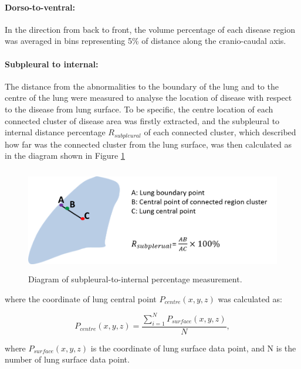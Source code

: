 \paragraph{Dorso-to-ventral:} In the direction from back to front, the volume percentage of each disease region was averaged in bins representing 5\% of distance along the cranio-caudal axis. 

\paragraph{Subpleural to internal:} The distance from the abnormalities to the boundary of the lung and to the centre of the lung were measured to analyse the location of disease with respect to the disease from lung surface. To be specific, the centre location of each connected cluster of disease area was firstly extracted, and the subpleural to internal distance percentage $R_{subpleural}$ of each connected cluster, which described how far was the connected cluster from the lung surface, was then calculated as in the diagram shown in Figure \ref{fig:SubpleuralMethod}

\begin{figure}[H]
  \centering 
  \includegraphics[height=1.8in]{QuantitativeAnalysis/Image/SubplesrualMethod.png}
  \caption{Diagram of subpleural-to-internal percentage measurement.}
  \label{fig:SubpleuralMethod}
\end{figure}
%

\noindent where the coordinate of lung central point $P_{centre}(x,y,z)$ was calculated as:

\begin{equation}
P_{centre}(x,y,z) = \frac{\sum\nolimits_{i=1}^N P_{surface}(x,y,z)}{N},
\end{equation}

\noindent where $P_{surface}(x,y,z)$ is the coordinate of lung surface data point, and N is the number of lung surface data point.

